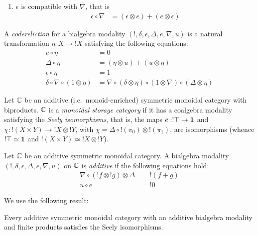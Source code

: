 \begin{definition}
\begin{enumerate}
\item $\epsilon$ is compatible with $\nabla$, that is
\begin{align}
 \epsilon \circ \nabla& =  (\epsilon\otimes e)+(e\otimes \epsilon)
\end{align}

\end{enumerate}

\end{definition}


\begin{definition}
A \emph{codereliction} for a bialgebra modality $(!,\delta,\epsilon,\Delta, e,\nabla,u)$ is a natural transformation $\eta:X\to !X$ satisfying the following equations:
\begin{align}
e\circ \eta & = 0\\
 \Delta\circ \eta&  = (\eta\otimes u)+(u\otimes \eta) \\
 \epsilon\circ \eta & = 1 \\
\delta \circ \nabla\circ(1\otimes \eta) & =  \nabla \circ 
 (\delta\otimes \eta) \circ  (1\otimes \nabla)\circ
(\Delta \otimes \eta)
\end{align}
\end{definition}


\begin{definition}
Let $\mathbb{C}$ be an additive (i.e.~monoid-enriched) symmetric monoidal category with biproducts.
 $\mathbb{C}$ is a \emph{monoidal storage category} if it has a coalgebra modality satisfying the \emph{Seely isomorphisms}, that is, the maps
 $e:!\top \to \mathbf{1}$ and $\chi:!(X\times Y) \to !X\otimes !Y$, with $\chi=\Delta \circ  !(\pi_{0})\otimes!(\pi_{1})$, are isomorphisms (whence $!\top\simeq \mathbf{1}$ and $!(X\times Y)\simeq !X\otimes !Y$).
\end{definition}


\begin{definition}
Let $\mathbb{C}$ be an additive symmetric monoidal category. A bialgebra modality $(!,\delta,\epsilon,\Delta,e,\nabla,u)$ on $\mathbb{C}$ is \emph{additive} if the following equations hold:
\begin{align}
\nabla\circ (!f\otimes !g)\otimes \Delta  & = !(f+g)\\ 
u\circ e & = !0
\end{align}
\end{definition}

We use the following result:
\begin{theorem}[Lemay\&co]\label{theorem:lemay}
Every additive symmetric monoidal category with an additive bialgebra modality and finite products satisfies the Seely isomorphisms.
\end{theorem}


